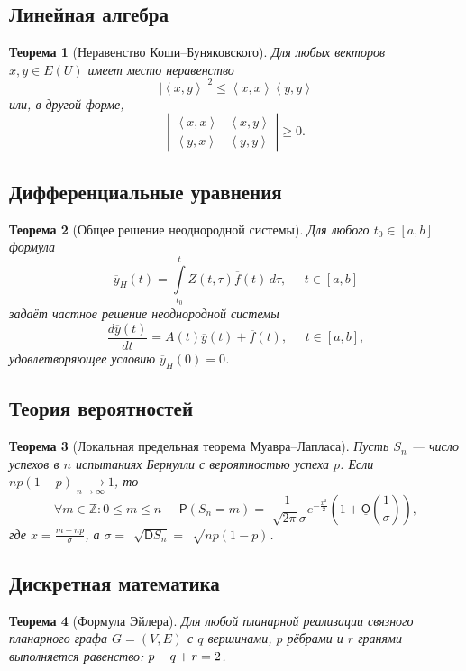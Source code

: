 \documentclass[11pt]{article}
\newtheorem{theorem}{Теорема}
\newcommand*{\hm}[1]{#1\nobreak\discretionary{}{\hbox{$\mathsurround=0pt #1$}}{}}
\newcommand\abs[1]{\left\lvert#1\right\rvert}
\newcommand{\scalar}[2]{\left<#1,#2\right>}
\begin{document}
\subsection{Линейная алгебра}
\begin{theorem}[Неравенство Коши--Буняковского]
Для любых векторов $x, y \in E(U)$ имеет место неравенство
$$ \abs{\scalar{x}{y}}^2 \leqslant \scalar{x}{x} \scalar{y}{y} $$
или, в другой форме,
$$  \left\lvert \begin{array}{ccc}
		\scalar{x}{x} & \scalar{x}{y} \\
		\scalar{y}{x} & \scalar{y}{y}
	\end{array} \right\rvert \geqslant 0 .
$$
\end{theorem}

\subsection{Дифференциальные уравнения}
\begin{theorem}[Общее решение неоднородной системы]
Для любого $t_0 \in [a,b]$ формула
$$ \overline{y}_H(t) = \int\limits_{t_0}^{t} Z(t, \tau) \overline{f}(t) \, d\tau, \;\;\;\;\; t \in [a,b] $$
задаёт частное решение неоднородной системы
$$ \frac{d\overline{y}(t)}{dt} = A(t)\overline{y}(t) + \overline{f}(t), \;\;\;\;\; t \in [a,b],$$
удовлетворяющее условию $ \overline{y}_H(0)=0 $.
\end{theorem}

\subsection{Теория вероятностей}
\begin{theorem}[Локальная предельная теорема Муавра--Лапласа]
Пусть $S_n$ --- число успехов в $n$ испытаниях Бернулли с вероятностью успеха $p$. Если $np(1-p) \xrightarrow[n \to \infty]{} 1$,
то
$$ \forall m \in \mathbb{Z}: 0 \leqslant m \leqslant n \;\;\;\;\; \mathsf{P}(S_n=m) = \frac{1}{\sqrt[]{2\pi}\sigma}e^{-\frac{x^2}{2}}
\left( 1 + \underline{\mathsf{O}} \left( \frac{1}{\sigma} \right) \right) ,$$
где $ x = \frac{m - np}{\sigma}$, а $\sigma = \, \sqrt[]{\mathsf{D}S_n} = \, \sqrt[]{np(1-p)}$.
\end{theorem}

\subsection{Дискретная математика}
\begin{theorem}[Формула Эйлера]
Для любой планарной реализации связного планарного графа $G=(V, E)$ с $q$ вершинами, $p$ рёбрами и $r$ гранями выполняется равенство: $p \hm- q \hm+ r \hm= 2$.
\end{theorem}
\end{document}
